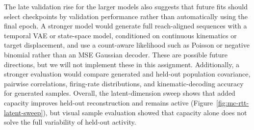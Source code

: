 \documentclass[10pt]{article}
\begin{document}
The late validation rise for the larger models also suggests that future fits should select checkpoints by validation performance rather than automatically using the final epoch.
A stronger model would generate full reach-aligned sequences with a temporal VAE or state-space model, conditioned on continuous kinematics or target displacement, and use a count-aware likelihood such as Poisson or negative binomial rather than an MSE Gaussian decoder. 
These are possible future directions, but we will not implement these in this assignment. 
Additionally, a stronger evaluation would compare generated and held-out population covariance, pairwise correlations, firing-rate distributions, and kinematic-decoding accuracy for generated samples.
Overall, the latent-dimension sweep shows that added capacity improves held-out reconstruction and remains active (Figure~\ref{fig:mc-rtt-latent-sweep}), but visual sample evaluation showed that capacity alone does not solve the full variability of held-out activity. 




\end{document}
